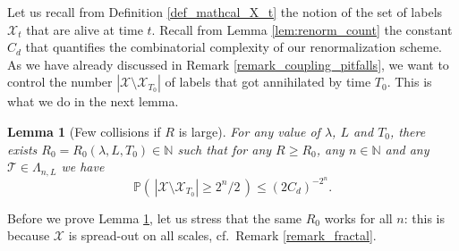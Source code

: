 \documentclass[a4paper,12pt]{article}
\newtheorem  {lemma}         [theorem]{Lemma}
\begin{document}
\smallskip

Let us recall from  Definition \ref{def_mathcal_X_t} the notion of the set of labels $\mathcal{X}_t$ that are alive at time $t$. Recall from  Lemma \ref{lem:renorm_count}
the constant $C_d$ that quantifies the combinatorial complexity of our renormalization scheme.
As we have already discussed in Remark \ref{remark_coupling_pitfalls}, we want to control the number $ |\mathcal{X} \setminus \mathcal{X}_{T_0}|$ of labels that got annihilated by time $T_0$. This is what we do in the next lemma.

\begin{lemma}[Few collisions if $R$ is large]\label{lemma_X_t_big}
 For any value of
$\lambda$, $L$ and $T_0$, there exists $R_0=R_0(\lambda,L,T_0) \in \mathbb{N}$ such that for
any $R \geq R_0$, any $n \in \mathbb{N}$ and any $\mathcal{T} \in \Lambda_{n,L}$ we have
\begin{equation}\label{X_t_big_eq}
  \mathbb{P}\left(\, |\mathcal{X} \setminus \mathcal{X}_{T_0}| \geq  2^n /2 \, \right) \leq \left( 2 C_d  \right)^{-2^n}.
\end{equation}
\end{lemma}
Before we prove Lemma \ref{lemma_X_t_big}, let us stress that the same $R_0$ works for all $n$:
this is because $\mathcal{X}$ is spread-out on all scales, cf.\ Remark \ref{remark_fractal}.
\end{document}
